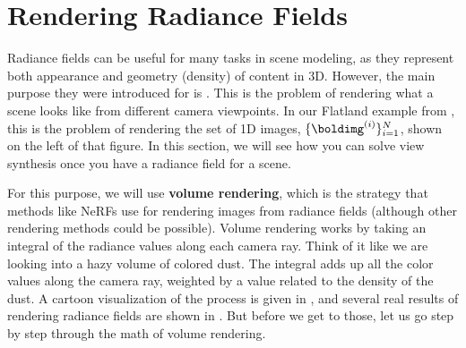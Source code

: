 

\section{Rendering Radiance Fields}\label{sec:nerfs:volume_rendering}
Radiance fields can be useful for many tasks in scene modeling, as they represent both appearance and geometry (density) of content in 3D. However, the main 
purpose they were introduced for is . This is the problem of rendering what a scene looks like from different 
camera viewpoints. In our Flatland example from \fig{\ref{fig:nerfs:flatland_cameras_and_images}}, this is the problem of rendering the set of 1D images, $\{\boldimg^{(i)}\}_{i=1}^N$, shown on the left of that figure. In this section, we will see how you can solve view synthesis once you have a radiance field for a scene.

For this purpose, we will use \textbf{volume rendering}, which is the strategy that methods like NeRFs use for 
rendering images from radiance fields (although other rendering methods could be possible). Volume rendering works by taking an integral 
of the radiance values along each camera ray. Think of it like we are looking into a hazy volume of colored dust. The integral adds up all the 
color values along the camera ray, weighted by a value related to the density of the dust. A cartoon visualization of the process is given in \fig{\ref{fig:nerfs:flatland_volume_rendering}}, and several real results of rendering radiance fields are shown in \fig{\ref{fig:nerfs:flatland_training}}. But before we get to those, let us go step by step through the math of volume rendering.

